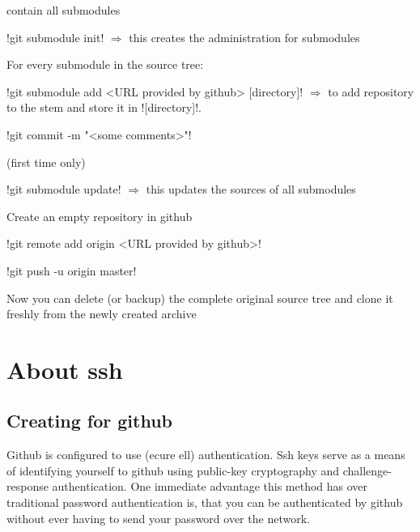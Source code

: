 \begin{itemize*}
\begin{itemize*}
         contain all submodules
   \item !git submodule init! $\Rightarrow$ this creates the administration for
         submodules
   \end{itemize*}
\item For every submodule in the source tree:
   \begin{itemize*}
   \item !git submodule add <URL provided by github> [directory]! $\Rightarrow$
         to add repository to the stem and store it in ![directory]!.
   \end{itemize*}
\item !git commit -m "<some comments>"!
\item (first time only)
   \begin{itemize*}
   \item !git submodule update! $\Rightarrow$ this updates the sources of all
         submodules
   \item Create an empty repository in github
   \item !git remote add origin <URL provided by github>!
   \item !git push -u origin master!
   \item Now you can delete (or backup) the complete original source tree and
         clone it freshly from the newly created archive
   \end{itemize*}
\end{itemize*}

\section{About ssh}

\subsection{Creating  for github}

Github is configured to use  (ecure ell)
authentication. Ssh keys serve as a means of
identifying yourself to github using public-key cryptography and 
challenge-response authentication. One immediate advantage this method has over
traditional password authentication is, that you can be authenticated by github
without ever having to send your password over the network.

